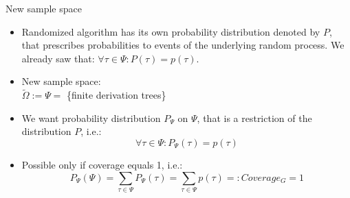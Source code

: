 \documentclass[t,usenames,dvipsnames]{beamer} %
\newcommand{\1}{\boldsymbol{1}}
\newcommand{\0}{\boldsymbol{0}}
\begin{document}
\begin{frame}{New sample space}
    \begin{itemize}[<+->]
    \item Randomized algorithm has its own probability distribution denoted by  $P$, that
        prescribes probabilities to events of the underlying random process.
        We already saw that: $\forall \tau \in \Psi: P(\tau) = p(\tau)$.
    \item New sample space: \\ \( \tilde{\Omega}:= \Psi =\)  \{finite derivation trees\} \\
    \item We want probability distribution $P_\Psi$ on $\Psi$, that is a restriction of the distribution $P$, i.e.: 
        \[ \forall \tau \in \Psi: P_\Psi (\tau) = p(\tau) \]
    \item Possible only if coverage equals 1, i.e.:
        \[ P_\Psi(\Psi) = \sum_{\tau \in \Psi} P_\Psi (\tau) = \sum_{\tau \in \Psi} p(\tau) =: Coverage_G = 1 \]
\end{itemize}
\end{frame}
\end{document}
